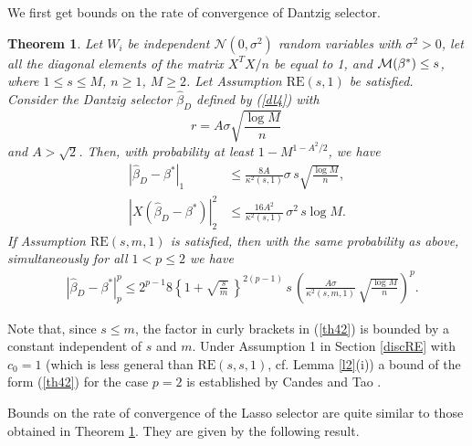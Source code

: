 \documentclass[dvips,aos]{imsart}
\numberwithin{equation}{section}
\theoremstyle{plain}
\newtheorem{thm}{Theorem}[section]%
\def\scm{{\cal M}}
\def\RE#1#2{$\text{RE}(#1,#2)$}
\def\REm#1#2#3{$\text{RE}(#1,#2,#3)$}
\newcommand{\bb}{\mbox{\boldmath$\beta$}}
\def\bb{\beta}
\begin{document}
We first get bounds on the rate of convergence of Dantzig selector.

\begin{thm}\label{th4}
Let  $W_i$ be independent ${\mathcal N}(0,\sigma^2)$ random
variables with $\sigma^2>0$, let all the diagonal elements of the
matrix $X^TX/n$ be equal to 1, and $\scm(\bb^*)\le s$, where $1\le s
\le M$, $n\ge1$, $M\ge2$. Let Assumption \RE s1 be satisfied.
Consider the Dantzig selector $\widehat \bb_D$ defined by
(\ref{dl4}) with
$$
r= A\sigma \sqrt{\frac{\log M}{n}}\,
$$
and $A>\sqrt{2}$. Then, with probability at least $1-M^{1-A^2/2}$,
we have
\begin{align}\label{th43}
 |\widehat\bb_D-\bb^*|_1 &\le \frac{8A}{\kappa^2(s,1)}
\sigma \, s \sqrt{\frac{\log M}{n}},\\
%
\label{th44} |X(\widehat\bb_D-\bb^*)|_2^2 &\le
\frac{16A^2}{\kappa^2(s,1)}\, \sigma^2\, s\log M.
\end{align}
If Assumption \REm sm1 is satisfied, then with the same probability
as above, simultaneously for all $1<p\le2$ we have
\begin{equation}\begin{split}
\label{th42} &|\widehat\bb_D-\bb^*|_p^p \le 2^{p-1}8
\left\{1+\sqrt{\frac{s}{m}}\,\right\}^{2(p-1)} \, s \, \left(
\frac{A\sigma}{\kappa^2(s,m,1)}\, \sqrt{\frac{ \log M}{n}}\right)^p.
\end{split}\end{equation}

\end{thm}




Note that, since $s\le m$, the factor in curly brackets in
(\ref{th42}) is bounded by a constant independent of $s$ and $m$.
Under Assumption  1 in Section \ref{discRE} with $c_0=1$ (which is
less general than \REm ss1, cf.
 Lemma \ref{l2}(i)) a bound
of the form (\ref{th42}) for the case $p=2$ is established by Candes
and Tao \cite{ct07}.

Bounds on the rate of convergence of the Lasso selector are quite
similar to those obtained in Theorem \ref{th4}. They are given by
the following result.
\end{document}
